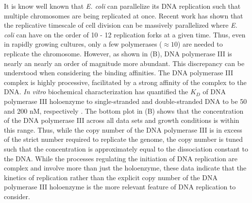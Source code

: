It is know well known that \textit{E. coli} can parallelize its DNA
replication such that multiple chromosomes are being replicated at once.
Recent work \citep{si2017} has shown that the replicative timescale of cell
division can be massively parallelized where \textit{E. coli} can have on the
order of 10 - 12 replication forks at a given time. Thus, even in rapidly
growing cultures, only a few polymerases ($\approx 10$) are needed to
replicate the chromosome. However, as shown in (B), DNA
polymerase III is nearly an nearly an order of magnitude more abundant. This
discrepancy can be understood when considering the binding affinities. The
DNA polymerase III complex is highly processive, facilitated by a strong
affinity of the complex to the DNA. \textit{In vitro} biochemical
characterization has quantified the $K_D$ of DNA polymerase III holoenzyme to
single-stranded and double-stranded DNA to be 50 and 200 nM, respectively \citep{ason2000}.
The bottom plot in  (B) shows that the concentration of the
DNA polymerase III across all data sets and growth conditions is within this
range. Thus, while the copy number of the DNA polymerase III
is in excess of the strict number required to replicate the genome, the copy
number is tuned such that the concentration is approximately equal to the
dissociation constant to the DNA. While the processes regulating the
initiation of DNA replication are complex and involve more than just the
holoenzyme, these data indicate that the kinetics of replication rather than
the explicit copy number of the DNA polymerase III holoenzyme is the more
relevant feature of DNA replication to consider.
